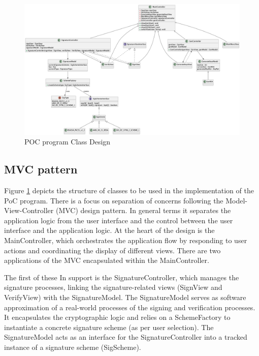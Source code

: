 \documentclass[]{final_report}
\theoremstyle{definition}
\begin{document}
\begin{landscape}
\thispagestyle{lscape} %
\begin{figure}[H]
    \centering
    \includegraphics[width=21.7cm]{POC.png}
    \caption{POC program Class Design}
    \label{fig:POCCLASSES}
\end{figure}
\end{landscape}

\subsection{MVC pattern}
Figure \ref{fig:POCCLASSES} depicts the structure of classes to be used in the implementation of the PoC program.  There is a focus on separation of concerns following the Model-View-Controller (MVC) design pattern. In general terms it separates the application logic from the user interface and the control between the user interface and the application logic. At the heart of the design is the MainController, which orchestrates the application flow by responding to user actions and coordinating the display of different views. There are two applications of the MVC encapsulated within the MainController.

The first of these In support is the SignatureController, which manages the signature processes, linking the signature-related views (SignView and VerifyView) with the SignatureModel. The SignatureModel serves as software approximation of a real-world processes of the signing and verification processes. It encapsulates the cryptographic logic and relies on a SchemeFactory to instantiate a concrete signature scheme (as per user selection). The SignatureModel acts as an interface for the SignatureController into a tracked instance of a signature scheme (SigScheme). 
\end{document}
